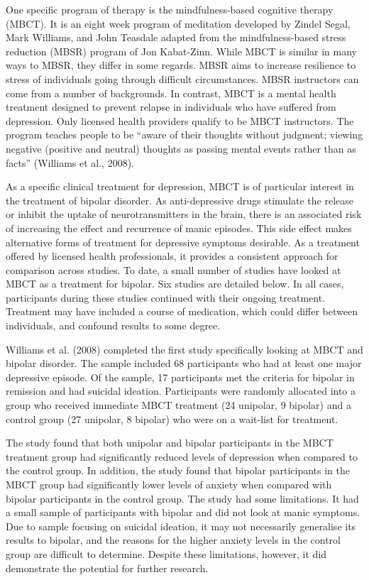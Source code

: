 {One specific program of therapy is the mindfulness-based cognitive therapy (MBCT). It is an eight week program of meditation developed by Zindel Segal, Mark Williams, and John Teasdale adapted from the mindfulness-based stress reduction (MBSR) program of Jon Kabat-Zinn. While MBCT is similar in many ways to MBSR, they differ in some regards. MBSR aims to increase resilience to stress of individuals going through difficult circumstances. MBSR instructors can come from a number of backgrounds. In contrast, MBCT is a mental health treatment designed to prevent relapse in individuals who have suffered from depression. Only licensed health providers qualify to be MBCT instructors. The program teaches people to be “aware of their thoughts without judgment; viewing negative (positive and neutral) thoughts as passing mental events rather than as facts” (Williams et al., 2008).

As a specific clinical treatment for depression, MBCT is of particular interest in the treatment of bipolar disorder. As anti-depressive drugs stimulate the release or inhibit the uptake of neurotransmitters in the brain, there is an associated risk of increasing the effect and recurrence of manic episodes. This side effect makes alternative forms of treatment for depressive symptoms desirable. As a treatment offered by licensed health professionals, it provides a consistent approach for comparison across studies. To date, a small number of studies have looked at MBCT as a treatment for bipolar. Six studies are detailed below. In all cases, participants during these studies continued with their ongoing treatment. Treatment may have included a course of medication, which could differ between individuals, and confound results to some degree. 

Williams et al. (2008) completed the first study specifically looking at MBCT and bipolar disorder. The sample included 68 participants who had at least one major depressive episode. Of the sample, 17 participants met the criteria for bipolar in remission and had suicidal ideation. Participants were randomly allocated into a group who received immediate MBCT treatment (24 unipolar, 9 bipolar) and a control group (27 unipolar, 8 bipolar) who were on a wait-list for treatment.

The study found that both unipolar and bipolar participants in the MBCT treatment group had significantly reduced levels of depression when compared to the control group. In addition, the study found that bipolar participants in the MBCT group had significantly lower levels of anxiety when compared with bipolar participants in the control group. The study had some limitations. It had a small sample of participants with bipolar and did not look at manic symptoms. Due to sample focusing on suicidal ideation, it may not necessarily generalise its results to bipolar, and the reasons for the higher anxiety levels in the control group are difficult to determine. Despite these limitations, however, it did demonstrate the potential for further research.

}
